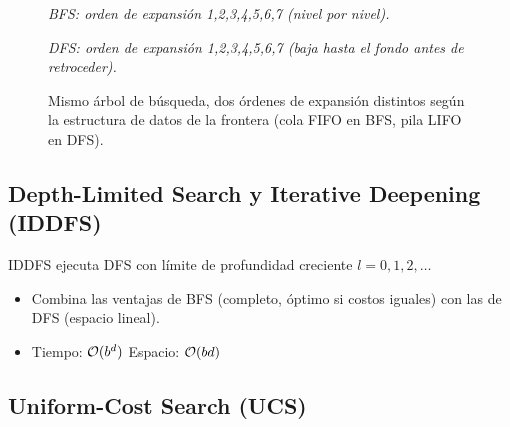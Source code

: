 \begin{figure}[H]
\centering
\begin{minipage}{0.48\textwidth}
\centering
{}

\small\textit{BFS: orden de expansión 1,2,3,4,5,6,7 (nivel por nivel).}
\end{minipage}
\hfill
\begin{minipage}{0.48\textwidth}
\centering
{}

\small\textit{DFS: orden de expansión 1,2,3,4,5,6,7 (baja hasta el fondo antes de retroceder).}
\end{minipage}
\caption{Mismo árbol de búsqueda, dos órdenes de expansión distintos según la estructura de datos de la frontera
(cola FIFO en BFS, pila LIFO en DFS).}
\end{figure}

\subsection{Depth-Limited Search y Iterative Deepening (IDDFS)}

IDDFS ejecuta DFS con límite de profundidad creciente $l = 0, 1, 2, \ldots$

\begin{itemize}
    \item Combina las ventajas de BFS (completo, óptimo si costos iguales) con las de DFS (espacio lineal).
    \item Tiempo: $\mathcal{O}(b^d)$ \quad Espacio: $\mathcal{O}(bd)$
\end{itemize}

\subsection{Uniform-Cost Search (UCS)}

